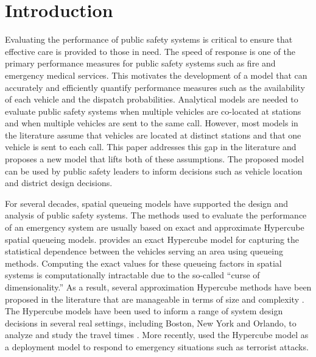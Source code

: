 \documentclass[11pt]{article}\topmargin 0mm
\begin{document}
\section{Introduction}
Evaluating the performance of public safety systems is critical
to ensure that effective care is provided to those in need. The
speed of response is one of the primary performance measures
for public safety systems such as fire and emergency medical
services. This motivates the development of a model that can
accurately and efficiently quantify performance measures such
as the availability of each vehicle and the dispatch
probabilities. Analytical models are needed to evaluate public
safety systems when multiple vehicles are co-located at
stations and when multiple vehicles are sent to the same call.
However, most models in the literature assume that vehicles are
located at distinct stations and that one vehicle is sent to
each call. This paper addresses this gap in the literature and
proposes a new model that lifts both of these assumptions.
%
{\color{blue}The proposed model can be used by public safety leaders to inform decisions such as vehicle location and district design decisions.
}


For several decades, spatial queueing models have supported the
design and analysis of public safety systems. The methods used
to evaluate the performance of an emergency system are usually
based on exact and approximate Hypercube spatial queueing
models. \citet{Larson74} provides an exact Hypercube model for
capturing the statistical dependence between the vehicles
serving an area using queueing methods. Computing the exact
values for these queueing factors in spatial systems is
computationally intractable due to the so-called ``curse of
dimensionality.'' As a result, several approximation Hypercube
methods have been proposed in the literature that are
manageable in terms of size and complexity \citep{Larson75}.
The Hypercube models have been used to inform a range of system design decisions in several real settings,
including Boston, New York and Orlando, to analyze and study
the travel times
\citep{brandeau1986extending,larson1987travel,sacks1994orlando}.
More recently, \citet{larson2004or} used the Hypercube model as
a deployment model to respond to emergency situations such as
terrorist attacks.
\end{document}
